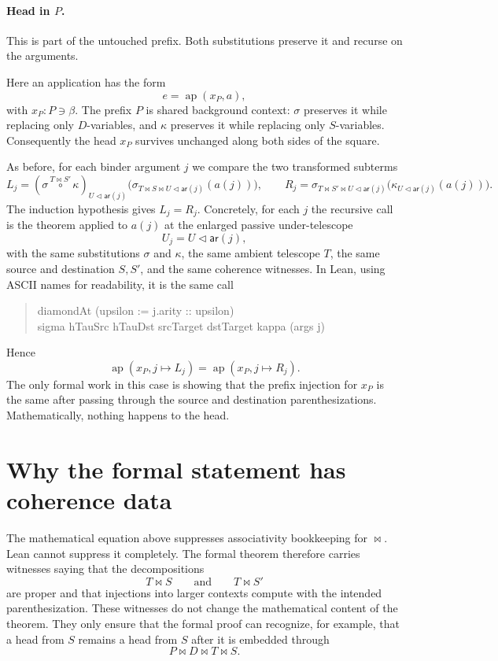 \documentclass[11pt]{article}
\newcommand{\arity}{\mathsf{ar}}
\newcommand{\ext}{\mathbin{\triangleleft}}
\newcommand{\pcomp}[3]{#1 \overset{#2}{\circ} #3}
\begin{document}
\paragraph{Head in \(P\).}
This is part of the untouched prefix.  Both substitutions preserve it and
recurse on the arguments.

Here an application has the form
\[
  e = \operatorname{ap}(x_P,a),
\]
with \(x_P : P \ni \beta\).  The prefix \(P\) is shared background context:
\(\sigma\) preserves it while replacing only \(D\)-variables, and \(\kappa\)
preserves it while replacing only \(S\)-variables.  Consequently the head
\(x_P\) survives unchanged along both sides of the square.

As before, for each binder argument \(j\) we compare the two transformed
subterms
\[
  L_j =
  (\pcomp{\sigma}{T \bowtie S'}{\kappa})_{U \ext \arity(j)}
  \bigl(
    \sigma_{T \bowtie S \bowtie U \ext \arity(j)}(a(j))
  \bigr),
  \qquad
  R_j =
  \sigma_{T \bowtie S' \bowtie U \ext \arity(j)}
  \bigl(
    \kappa_{U \ext \arity(j)}(a(j))
  \bigr).
\]
The induction hypothesis gives \(L_j = R_j\).  Concretely, for each \(j\) the
recursive call is the theorem applied to \(a(j)\) at the enlarged passive
under-telescope
\[
  U_j = U \ext \arity(j),
\]
with the same substitutions \(\sigma\) and \(\kappa\), the same ambient
telescope \(T\), the same source and destination \(S,S'\), and the same
coherence witnesses.  In Lean, using ASCII names for readability, it is the
same call
\begin{quote}
\small\ttfamily
diamondAt (upsilon := j.arity :: upsilon)\\
\hspace*{2em}sigma hTauSrc hTauDst srcTarget dstTarget kappa (args j)
\end{quote}
Hence
\[
  \operatorname{ap}(x_P, j \mapsto L_j)
  =
  \operatorname{ap}(x_P, j \mapsto R_j).
\]
The only formal work in this case is showing that the prefix injection for
\(x_P\) is the same after passing through the source and destination
parenthesizations.  Mathematically, nothing happens to the head.

\section*{Why the formal statement has coherence data}

The mathematical equation above suppresses associativity bookkeeping for
\(\bowtie\).  Lean cannot suppress it completely.  The formal theorem therefore
carries witnesses saying that the decompositions
\[
  T \bowtie S
  \qquad\text{and}\qquad
  T \bowtie S'
\]
are proper and that injections into larger contexts compute with the intended
parenthesization.  These witnesses do not change the mathematical content of
the theorem.  They only ensure that the formal proof can recognize, for example,
that a head from \(S\) remains a head from \(S\) after it is embedded through
\[
  P \bowtie D \bowtie T \bowtie S.
\]
\end{document}
